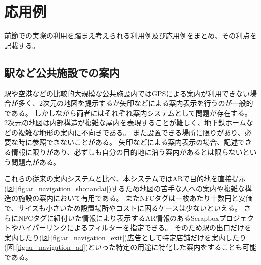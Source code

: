 \section{応用例}
前節での実際の利用を踏まえ考えられる利用例及び応用例をまとめ、その利点を記載する。

\subsection{駅など公共施設での案内}
駅や空港などの比較的大規模な公共施設内ではGPSによる案内が利用できない場合が多く、2次元の地図を提示するか矢印などによる案内表示を行うのが一般的である。
しかしながら両者にはそれぞれ案内システムとして問題が存在する。
2次元の地図は内部構造が複雑な屋内を表現することが難しく、地下鉄ホームなどの複雑な地形の案内に不向きである。
また設置できる場所に限りがあり、必要な時に参照できないことがある。
矢印などによる案内表示の場合、記述できる情報に限りがあり、必ずしも自分の目的地に沿う案内があるとは限らないという問題点がある。

これらの従来の案内システムと比べ、本システムではARで目的地を直接提示(図:\ref{fig:ar_navigation_shonandai})するため地図の苦手な人への案内や複雑な構造の施設の案内において有用である。
またNFCタグは一枚あたり十数円と安価で、サイズも小さいため設置場所やコストに困るケースは少ないといえる。
さらにNFCタグに紐付いた情報により表示するAR情報のあるScrapboxプロジェクトやハイパーリンクによるフィルターを指定できる。
そのため駅の出口だけを案内したり(図:\ref{fig:ar_navigation_exit})広告として特定店舗だけを案内したり(図:\ref{fig:ar_navigation_ad})といった特定の用途に特化した案内をすることも可能である。

